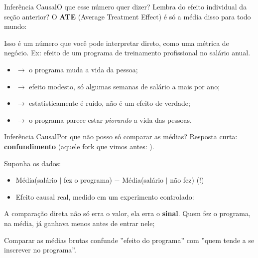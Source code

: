 \begin{frame}{Inferência Causal}{O que esse número quer dizer?}
    Lembra do efeito individual  da seção anterior? O \textbf{ATE} (Average Treatment Effect) é só a média disso para todo mundo:

    \vspace{10pt}
    \centering {}
    \raggedright

    \vspace{15pt}
    \pause

    Isso é um número que você pode interpretar direto, como uma métrica de negócio. Ex: efeito de um programa de treinamento profissional no salário anual.

    \pause
    \begin{itemize}
        \item {} \pause $\to$ o programa muda a vida da pessoa;
        \item {} \pause $\to$ efeito modesto, só algumas semanas de salário a mais por ano;
        \item {} \pause $\to$ estatisticamente é ruído, não é um efeito de verdade;
        \item {} \pause $\to$ o programa parece estar \textit{piorando} a vida das pessoas.
    \end{itemize}
\end{frame}

\begin{frame}{Inferência Causal}{Por que não posso só comparar as médias?}
    Resposta curta: \textbf{confundimento} (aquele fork que vimos antes: ).

    \pause
    \vfill

    Suponha os dados:
    \begin{itemize}
        \item Média(salário $\mid$ fez o programa) $-$ Média(salário $\mid$ não fez)  \pause \alert{(!)}
        \item Efeito causal real, medido em um experimento controlado: 
    \end{itemize}

    \pause
    \vfill
    A comparação direta não só erra o valor, ela erra o \textbf{sinal}. Quem fez o programa, na média, já ganhava menos antes de entrar nele;
    
    Comparar as médias brutas confunde ''efeito do programa'' com ''quem tende a se inscrever no programa''.
\end{frame}

